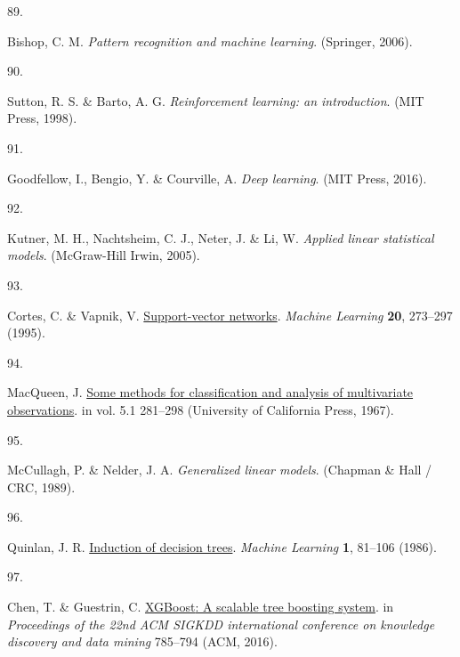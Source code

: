 \documentclass[
  10pt,
]{scrbook}
\newlength{\cslhangindent}
\newlength{\csllabelwidth}
\newlength{\cslentryspacingunit} %
\newenvironment{CSLReferences}[2] %
 {%
  \setlength{\parindent}{0pt}
  \ifodd #1
  \let\oldpar\par
  \def\par{\hangindent=\cslhangindent\oldpar}
  \fi
  \setlength{\parskip}{#2\cslentryspacingunit}
 }%
 {}
\newcommand{\CSLLeftMargin}[1]{\parbox[t]{\csllabelwidth}{#1}}
\newcommand{\CSLRightInline}[1]{\parbox[t]{\linewidth - \csllabelwidth}{#1}\break}
\let\originaltextbf\textbf
\renewcommand{\textbf}[1]{\textcolor{color1}{\textsf{\originaltextbf{#1}}}}
\begin{document}
\begin{CSLReferences}{0}{0}
\leavevmode{}%
\CSLLeftMargin{89. }%
\CSLRightInline{Bishop, C. M. \emph{Pattern recognition and machine
learning}. (Springer, 2006).}

\leavevmode{}%
\CSLLeftMargin{90. }%
\CSLRightInline{Sutton, R. S. \& Barto, A. G. \emph{Reinforcement
learning: an introduction}. (MIT Press, 1998).}

\leavevmode{}%
\CSLLeftMargin{91. }%
\CSLRightInline{Goodfellow, I., Bengio, Y. \& Courville, A. \emph{Deep
learning}. (MIT Press, 2016).}

\leavevmode{}%
\CSLLeftMargin{92. }%
\CSLRightInline{Kutner, M. H., Nachtsheim, C. J., Neter, J. \& Li, W.
\emph{Applied linear statistical models}. (McGraw-Hill Irwin, 2005).}

\leavevmode{}%
\CSLLeftMargin{93. }%
\CSLRightInline{Cortes, C. \& Vapnik, V.
\href{https://doi.org/10.1007/BF00994018}{Support-vector networks}.
\emph{Machine Learning} \textbf{20}, 273--297 (1995).}

\leavevmode{}%
\CSLLeftMargin{94. }%
\CSLRightInline{MacQueen, J.
\href{https://projecteuclid.org/ebooks/berkeley-symposium-on-mathematical-statistics-and-probability/Proceedings-of-the-Fifth-Berkeley-Symposium-on-Mathematical-Statistics-and/chapter/Some-methods-for-classification-and-analysis-of-multivariate-observations/bsmsp/1200512992}{Some
methods for classification and analysis of multivariate observations}.
in vol. 5.1 281--298 (University of California Press, 1967).}

\leavevmode{}%
\CSLLeftMargin{95. }%
\CSLRightInline{McCullagh, P. \& Nelder, J. A. \emph{Generalized linear
models}. (Chapman \& Hall / CRC, 1989).}

\leavevmode{}%
\CSLLeftMargin{96. }%
\CSLRightInline{Quinlan, J. R.
\href{https://doi.org/10.1007/BF00116251}{Induction of decision trees}.
\emph{Machine Learning} \textbf{1}, 81--106 (1986).}

\leavevmode{}%
\CSLLeftMargin{97. }%
\CSLRightInline{Chen, T. \& Guestrin, C.
\href{https://doi.org/10.1145/2939672.2939785}{{XGBoost}: A scalable
tree boosting system}. in \emph{Proceedings of the 22nd ACM SIGKDD
international conference on knowledge discovery and data mining}
785--794 (ACM, 2016).}


\end{CSLReferences}
\end{document}
